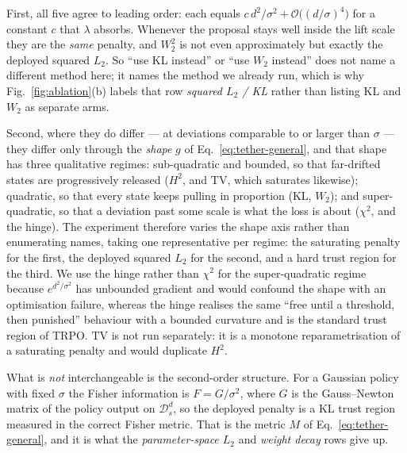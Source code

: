 First, all five agree to leading order: each equals $c\,d^2/\sigma^2 +
\mathcal{O}\big((d/\sigma)^4\big)$ for a constant $c$ that $\lambda$ absorbs.
Whenever the proposal stays well inside the lift scale they are the \emph{same}
penalty, and $W_2^2$ is not even approximately but exactly the deployed squared
$L_2$. So ``use KL instead'' or ``use $W_2$ instead'' does not name a different
method here; it names the method we already run, which is why
Fig.~\ref{fig:ablation}(b) labels that row \emph{squared $L_2$ / KL} rather than
listing KL and $W_2$ as separate arms.

Second, where they do differ --- at deviations comparable to or larger than
$\sigma$ --- they differ only through the \emph{shape} $g$ of
Eq.~\ref{eq:tether-general}, and that shape has three qualitative regimes:
sub-quadratic and bounded, so that far-drifted states are progressively released
($H^2$, and $\mathrm{TV}$, which saturates likewise); quadratic, so that every
state keeps pulling in proportion ($\mathrm{KL}$, $W_2$); and super-quadratic,
so that a deviation past some scale is what the loss is about ($\chi^2$, and the
hinge). The experiment therefore varies the shape axis rather than enumerating
names, taking one representative per regime: the saturating penalty for the
first, the deployed squared $L_2$ for the second, and a hard trust region for
the third. We use the hinge rather than $\chi^2$ for the super-quadratic regime
because $e^{d^2/\sigma^2}$ has unbounded gradient and would confound the shape
with an optimisation failure, whereas the hinge realises the same
``free until a threshold, then punished'' behaviour with a bounded curvature and
is the standard trust region of TRPO. $\mathrm{TV}$ is not run separately: it is
a monotone reparametrisation of a saturating penalty and would duplicate $H^2$.

What is \emph{not} interchangeable is the second-order structure. For a Gaussian
policy with fixed $\sigma$ the Fisher information is $F = G/\sigma^2$, where $G$
is the Gauss--Newton matrix of the policy output on $\mathcal{D}^d_s$, so the
deployed penalty is a KL trust region measured in the correct Fisher metric.
That is the metric $M$ of Eq.~\ref{eq:tether-general}, and it is what the
\emph{parameter-space $L_2$} and \emph{weight decay} rows give up.

